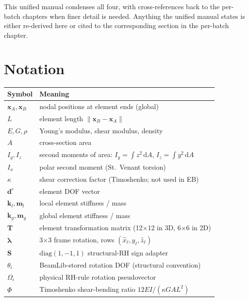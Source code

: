 \documentclass[11pt,a4paper]{book}
\newcommand{\dd}{\mathrm{d}}
\newcommand{\bmath}[1]{\boldsymbol{#1}}
\newcommand{\xhatl}{\hat{x}_\ell}
\newcommand{\yhatl}{\hat{y}_\ell}
\newcommand{\zhatl}{\hat{z}_\ell}
\newcommand{\Sdiag}{\bmath{S}}
\newcommand{\lam}{\bmath{\lambda}}
\begin{document}
This unified manual condenses all four, with cross-references back to the per-batch chapters when finer detail is needed. Anything the unified manual states is either re-derived here or cited to the corresponding section in the per-batch chapter.

\section*{Notation}

\begin{tabular}{l l}
\toprule
Symbol & Meaning \\
\midrule
$\bmath{x}_A,\bmath{x}_B$ & nodal positions at element ends (global) \\
$L$                       & element length $\|\bmath{x}_B - \bmath{x}_A\|$ \\
$E, G, \rho$              & Young's modulus, shear modulus, density \\
$A$                       & cross-section area \\
$I_y, I_z$                & second moments of area: $I_y = \int z^2\,\dd A$, $I_z = \int y^2\,\dd A$ \\
$I_x$                     & polar second moment (St.\ Venant torsion) \\
$\kappa$                  & shear correction factor (Timoshenko; not used in EB) \\
$\bmath{d}^e$             & element DOF vector \\
$\bmath{k}_l, \bmath{m}_l$ & local element stiffness / mass \\
$\bmath{k}_g, \bmath{m}_g$ & global element stiffness / mass \\
$\bmath{T}$               & element transformation matrix (12$\times$12 in 3D, 6$\times$6 in 2D) \\
$\lam$                    & 3$\times$3 frame rotation, rows $(\xhatl, \yhatl, \zhatl)$ \\
$\Sdiag$                  & $\mathrm{diag}(1, -1, 1)$ structural-RH sign adapter \\
$\theta_i$                & BeamLib-stored rotation DOF (structural convention) \\
$\Omega_i$                & physical RH-rule rotation pseudovector \\
$\Phi$                    & Timoshenko shear-bending ratio $12 E I / (\kappa GA L^2)$ \\
\bottomrule
\end{tabular}
\end{document}
